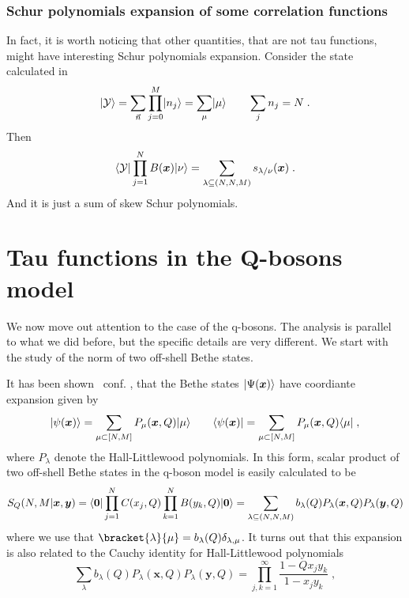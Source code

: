 \documentclass[a4paper,11pt]{amsart}
\begin{document}
\subsubsection{Schur polynomials expansion of some correlation functions}
In fact, it is worth noticing that other quantities, that are not tau
functions, might have interesting Schur polynomials expansion.
Consider the state calculated in~\cite{Bogoliubov2005}
\begin{equation}
  \lvert\mathcal{Y}\rangle =
 \sum_{\vec{n}} \prod_{j=0}^M \lvert n_j\rangle = \sum_\mu \lvert\mu\rangle \qquad \sum_j n_j = N\; .
\end{equation}
Then
\begin{equation}
 \langle\mathcal{Y}\rvert \prod_{j=1}^N B(\bm{x}) \lvert\nu\rangle = 
  \sum_{\lambda\subseteq (N,N,M)} s_{\lambda/\nu}(\bm{x})\; . 
\end{equation}
And it is just a sum of skew Schur polynomials.


\section{Tau functions in the Q-bosons model}

We now move out attention to the case of the q-bosons. The 
analysis is parallel to what we did before, but the  specific 
details are very different. We start with the study of the norm of  
two off-shell Bethe states. 

It has been shown~\cite{Tsilevich:2006} conf. \cite{Sulkowski:2008mx,
  Wheeler:2010vmq}, that the Bethe states \(\lvert\Psi(\bm{x})\rangle\) have 
coordiante expansion given by
\begin{equation}
  \lvert\psi(\bm{x})\rangle = \sum_{\mu \subset [N,M]} P_\mu(\bm{x}, Q) \lvert\mu\rangle  \qquad 
  \langle\psi(\bm{x})\rvert = \sum_{\mu \subset [N,M]} P_\mu(\bm{x}, Q) \langle\mu\rvert\; ,
\end{equation}
where \(P_\lambda\) denote the Hall-Littlewood polynomials.  In this
form, scalar product of two off-shell Bethe states in the q-boson
model is easily calculated to be
\begin{equation}
\label{eq:scalar-hl}
S_Q(N,M | \bm{x}, \bm{y}) = \langle\bm{0}\rvert \prod_{j=1}^N C(x_j, Q)
\prod_{k=1}^N B(y_k, Q) \lvert\bm{0}\rangle
= \sum_{\lambda \subseteq
  (N,N,M)} b_\lambda(Q) P_{\lambda}(\bm{x}, Q) P_{\lambda}(\bm{y}, Q)
\end{equation}
where we use that \(\bracket{\lambda}{\mu} = b_\lambda(Q)
\delta_{\lambda, \mu}\).  It turns out that this expansion is also
related to the Cauchy identity for Hall-Littlewood
polynomials~\cite{Macdonald:1998}
\begin{equation}
\label{eq:cauchy_hl}
\sum_{\lambda} b_\lambda(Q) P_{\lambda}(\bm{x}, Q) P_{\lambda}(\bm{y}, Q)
= \prod_{j, k=1}^\infty \frac{1-Q x_j y_k}{1 - x_j y_k}\; ,
\end{equation}
\end{document}
